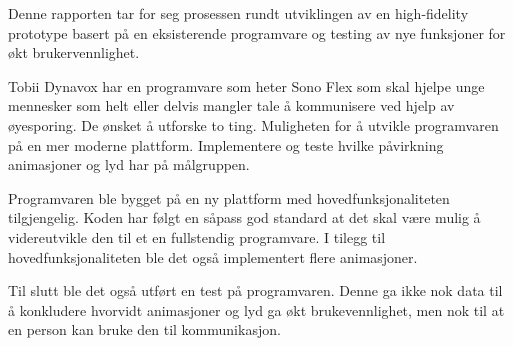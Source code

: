 
Denne rapporten tar for seg prosessen rundt utviklingen av en high-fidelity prototype basert på en eksisterende programvare og testing av nye funksjoner for økt brukervennlighet. 

Tobii Dynavox har en programvare som heter Sono Flex som skal hjelpe unge mennesker som helt eller delvis mangler tale å kommunisere ved hjelp av øyesporing. De ønsket å utforske to ting.  Muligheten for å utvikle programvaren på en mer moderne plattform. Implementere og teste hvilke påvirkning animasjoner og lyd har på målgruppen.

Programvaren ble bygget på en ny plattform med hovedfunksjonaliteten tilgjengelig. Koden har følgt en såpass god standard at det skal være mulig å videreutvikle den til et en fullstendig programvare. I tilegg til hovedfunksjonaliteten ble det også implementert flere animasjoner. 

Til slutt ble det også utført en test på programvaren. Denne ga ikke nok data til å konkludere hvorvidt animasjoner og lyd ga økt brukevennlighet, men nok til at en person kan bruke den til kommunikasjon.


